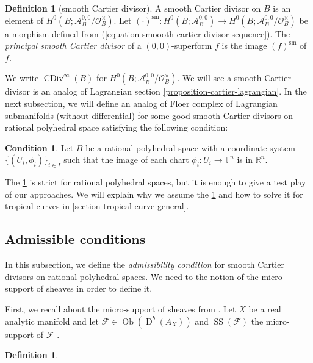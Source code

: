 \documentclass[a4paper,dvipdfmx,reqno,12pt]{amsart}
\theoremstyle{definition}
\newtheorem{definition}[theorem]{Definition}
\newtheorem{condition}[theorem]{Condition}
\newcommand{\mcal}[1]{\mathcal{#1}}%
\newcommand{\opn}[1]{\operatorname{#1}}
\numberwithin{equation}{section}
\begin{document}
\begin{definition}[{smooth Cartier divisor}]
A smooth Cartier divisor on $B$ is an element of
$H^{0}(B;\mathcal{A}^{0,0}_{B}/\mathcal{O}^{\times}_B)$.
Let 
$(\cdot)^{\mathrm{sm}}\colon 
H^{0}(B;\mathcal{A}^{0,0}_B)\to 
H^{0}(B;\mathcal{A}^{0,0}_{B}/\mathcal{O}^{\times}_B)$ 
be a morphism defined from 
(\ref{equation-smoooth-cartier-divisor-sequence}).
The \emph{principal smooth Cartier divisor} of a $(0,0)$-superform 
$f$ is the image $(f)^{\mathrm{sm}}$ of $f$.
\end{definition}
We write $\opn{CDiv}^{\infty}(B)$ for 
$H^{0}(B;\mathcal{A}^{0,0}_{B}/\mathcal{O}^{\times}_B)$.
We will see a smooth Cartier divisor is
an analog of Lagrangian section 
\cref{proposition-cartier-lagrangian}.
In the next subsection, 
we will define an analog of Floer complex of 
Lagrangian submanifolds
(without differential) for some good smooth Cartier 
divisors on rational polyhedral space satisfying 
the following condition:

\begin{condition}
\label{condition-Rn}
Let $B$ be a rational polyhedral space with 
a coordinate system $\{(U_i,\phi_i)\}_{i\in I}$
such that the image of each chart 
$\phi_i\colon U_i \to \mathbb{T}^{n}$
is in $\mathbb{R}^{n}$.
\end{condition}

The \cref{condition-Rn} is strict for rational polyhedral
spaces, but it is enough to
give a test play of our approaches.
We will explain why we assume the \cref{condition-Rn}
and how to solve it
for tropical curves in 
\cref{section-tropical-curve-general}.

\subsection{Admissible conditions}

In this subsection, we define 
the \emph{admissibility condition} for
smooth Cartier divisors on rational 
polyhedral spaces.
We need to the notion of 
the micro-support of sheaves in order to define it.

First, we recall about the micro-support of sheaves 
from \cite{MR1299726}.
Let $X$ be a real analytic manifold and let
$\mcal{F}\in\opn{Ob}(\opn{D}^{b}(A_X))$ and
$\opn{SS}(\mcal{F})$ the micro-support of $\mcal{F}$
\cite[Definition 5.1.2]{MR1299726}.
\begin{definition}

\end{definition}
\end{document}
